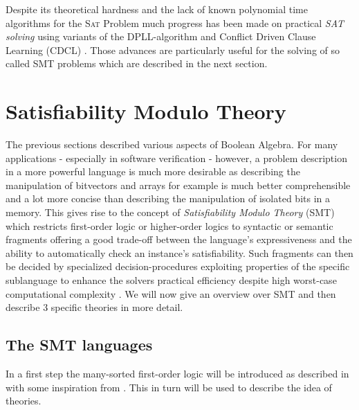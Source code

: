 Despite its theoretical hardness and the lack of known polynomial time algorithms for the \textsc{Sat} Problem much progress has been made on practical \textit{SAT solving} using variants of the DPLL-algorithm and Conflict Driven Clause Learning (CDCL) \cite{Marques-Silva-PropositionalSATSolving}.  Those advances are particularly useful for the solving of so called SMT problems which are described in the next section.


\section{Satisfiability Modulo Theory}
The previous sections described various aspects of Boolean Algebra. For many applications - especially in software verification - however, a problem description in a more powerful language is much more desirable as describing the manipulation of bitvectors and arrays for example is much better comprehensible and a lot more concise than describing the manipulation of isolated bits in a memory. This gives rise to the concept of \textit{Satisfiability Modulo Theory} (SMT) which restricts first-order logic or higher-order logics to syntactic or semantic fragments offering a good trade-off between the language's expressiveness and the ability to automatically check an instance's satisfiability. Such fragments can then be decided by specialized decision-procedures exploiting properties of the specific sublanguage to enhance the solvers practical efficiency despite high worst-case computational complexity \cite{Barrett-Tinelli-SMT}. We will now give an overview over SMT and then describe 3 specific theories in more detail.

\subsection{The SMT languages}
In a first step the many-sorted first-order logic will be introduced as described in \cite{Barrett-Tinelli-SMT} with some inspiration from \cite{fondements-logique}. This in turn will be used to describe the idea of theories.


